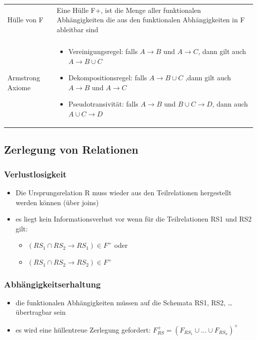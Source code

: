 \documentclass[a4paper]{article}
\begin{document}
\begin{tabular}{l p{10cm}}
     
     Hülle von F & Eine Hülle F+, ist die Menge aller funktionalen Abhängigkeiten die aus den funktionalen Abhängigkeiten in F ableitbar sind \\
     & \\
     Armstrong Axiome & \begin{itemize}
         \item Vereinigungsregel: falls $A \rightarrow B$ und $A \rightarrow C$, dann gilt auch $A \rightarrow B \cup C$
         \item Dekompositionsregel: falls $A \rightarrow B \cup C$ ,dann gilt auch $A \rightarrow B$ und $A \rightarrow C$
         \item Pseudotransivität: falls $A \rightarrow B$ und $B \cup C \rightarrow D$, dann  auch $A \cup C \rightarrow D$
     \end{itemize}
\end{tabular}

\subsection{Zerlegung von Relationen}
\subsubsection{Verlustlosigkeit}
\begin{itemize}
    \item Die Ursprungsrelation R muss wieder aus den Teilrelationen hergestellt werden können (über joins)
    \item es liegt kein Informationsverlust vor wenn für die Teilrelationen RS1 und RS2 gilt:
    \begin{itemize}
        \item $(RS_1 \cap RS_2 \rightarrow RS_1) \in F^+$ oder 
        \item $(RS_1 \cap RS_2 \rightarrow RS_2) \in F^+$
    \end{itemize}
\end{itemize}

\subsubsection{Abhängigkeitserhaltung}
\begin{itemize}
    \item die funktionalen Abhängigkeiten müssen auf die Schemata RS1, RS2, … übertragbar sein
    \item es wird eine hüllentreue Zerlegung gefordert: $F_{RS}^+ = (F_{RS_1} \cup ... \cup F_{RS_n})^+$ 
\end{itemize}
\end{document}
